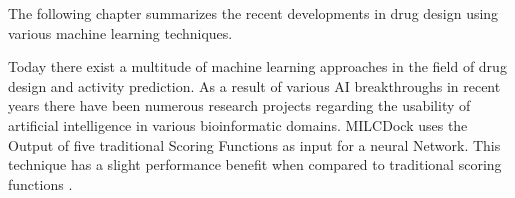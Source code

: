 The following chapter summarizes the recent developments in drug design using various machine 
learning techniques. 

Today there exist a multitude of machine learning approaches in the field of drug design and activity prediction.
As a result of various AI breakthroughs in recent years there have been numerous research projects regarding the usability of artificial intelligence
in various bioinformatic domains. 
MILCDock uses the Output of five traditional Scoring Functions as input for a neural Network. This technique has a slight performance benefit when compared to traditional scoring functions \cite[]{Morris2022}.
